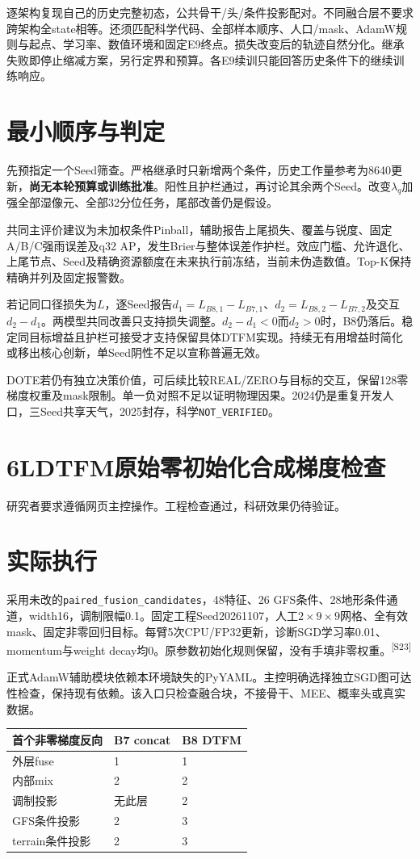 \documentclass[UTF8,10.5pt,a4paper,fontset=none]{ctexart}
\newcommand{\evi}[1]{\textsuperscript{\color{muted}[#1]}}
\newcommand{\pageheading}[2]{\clearpage\section*{#1}\textcolor{muted}{#2}\par\vspace{3pt}}
\begin{document}
逐架构复现自己的历史完整初态，公共骨干/头/条件投影配对。不同融合层不要求跨架构全state相等。还须匹配科学代码、全部样本顺序、人口/mask、AdamW规则与起点、学习率、数值环境和固定E9终点。损失改变后的轨迹自然分化。继承失败即停止缩减方案，另行定界和预算。各E9续训只能回答历史条件下的继续训练响应。

\section*{最小顺序与判定}
先预指定一个Seed筛查。严格继承时只新增两个条件，历史工作量参考为8640更新，\textbf{尚无本轮预算或训练批准}。阳性且护栏通过，再讨论其余两个Seed。改变$\lambda_q$加强全部湿像元、全部32分位任务，尾部改善仍是假设。

共同主评价建议为未加权条件Pinball，辅助报告上尾损失、覆盖与锐度、固定A/B/C强雨误差及q32 AP，发生Brier与整体误差作护栏。效应门槛、允许退化、上尾节点、Seed及精确资源额度在未来执行前冻结，当前未伪造数值。Top-K保持精确并列及固定报警数。

若记同口径损失为$L$，逐Seed报告$d_1=L_{B8,1}-L_{B7,1}$、$d_2=L_{B8,2}-L_{B7,2}$及交互$d_2-d_1$。两模型共同改善只支持损失调整。$d_2-d_1<0$而$d_2>0$时，B8仍落后。稳定同目标增益且护栏可接受才支持保留具体DTFM实现。持续无有用增益时简化或移出核心创新，单Seed阴性不足以宣称普遍无效。

DOTE若仍有独立决策价值，可后续比较REAL/ZERO与目标的交互，保留128零梯度权重及mask限制。单一负对照不足以证明物理因果。2024仍是重复开发人口，三Seed共享天气，2025封存，科学\texttt{NOT\_VERIFIED}。

\pageheading{6L\quad DTFM原始零初始化合成梯度检查}{研究者要求遵循网页主控操作。工程检查通过，科研效果仍待验证。}
\section*{实际执行}
采用未改的\texttt{paired\_fusion\_candidates}，48特征、26 GFS条件、28地形条件通道，width16，调制限幅0.1。固定工程Seed20261107，人工$2\times9\times9$网格、全有效mask、固定非零回归目标。每臂5次CPU/FP32更新，诊断SGD学习率0.01、momentum与weight decay均0。原参数初始化规则保留，没有手填非零权重。\evi{S23}

正式AdamW辅助模块依赖本环境缺失的PyYAML。主控明确选择独立SGD图可达性检查，保持现有依赖。该入口只检查融合块，不接骨干、MEE、概率头或真实数据。

\begin{tabularx}{\textwidth}{@{}p{4cm}X X@{}}
\toprule 首个非零梯度反向 & B7 concat & B8 DTFM\\\midrule
外层fuse & 1 & 1\\
内部mix & 2 & 2\\
调制投影 & 无此层 & 2\\
GFS条件投影 & 2 & 3\\
terrain条件投影 & 2 & 3\\
\bottomrule
\end{tabularx}
\end{document}
